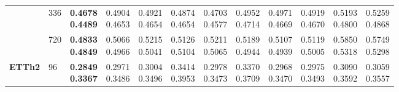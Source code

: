 \begin{longtable}{@{}llcccccccccc@{}}
 & 336 & \shortstack{\colorbox[gray]{0.82}{\textbf{0.4678}}\\\colorbox[gray]{0.82}{\textbf{0.4489}}} & \shortstack{0.4904\\0.4653} & \shortstack{0.4921\\0.4654} & \shortstack{0.4874\\0.4654} & \shortstack{\colorbox[gray]{0.92}{0.4703}\\\colorbox[gray]{0.92}{0.4577}} & \shortstack{0.4952\\0.4714} & \shortstack{0.4971\\0.4669} & \shortstack{0.4919\\0.4670} & \shortstack{0.5193\\0.4800} & \shortstack{0.5259\\0.4868} \\ \cline{2-12}

 & 720 & \shortstack{\colorbox[gray]{0.82}{\textbf{0.4833}}\\\colorbox[gray]{0.82}{\textbf{0.4849}}} & \shortstack{\colorbox[gray]{0.92}{0.5066}\\0.4966} & \shortstack{0.5215\\0.5041} & \shortstack{0.5126\\0.5104} & \shortstack{0.5211\\0.5065} & \shortstack{0.5189\\0.4944} & \shortstack{0.5107\\\colorbox[gray]{0.92}{0.4939}} & \shortstack{0.5119\\0.5005} & \shortstack{0.5850\\0.5318} & \shortstack{0.5749\\0.5298} \\ \hline

\textbf{ETTh2} & 96 & \shortstack{\colorbox[gray]{0.82}{\textbf{0.2849}}\\\colorbox[gray]{0.82}{\textbf{0.3367}}} & \shortstack{0.2971\\0.3486} & \shortstack{0.3004\\0.3496} & \shortstack{0.3414\\0.3953} & \shortstack{0.2978\\0.3473} & \shortstack{0.3370\\0.3709} & \shortstack{\colorbox[gray]{0.92}{0.2968}\\\colorbox[gray]{0.92}{0.3470}} & \shortstack{0.2975\\0.3493} & \shortstack{0.3090\\0.3592} & \shortstack{0.3059\\0.3557} \\ \cline{2-12}


\end{longtable}
